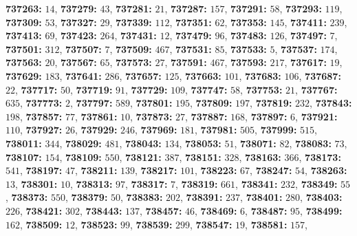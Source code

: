 \textsf{\bfseries 737263:} $14$, \textsf{\bfseries 737279:} $43$, \textsf{\bfseries 737281:} $21$, \textsf{\bfseries 737287:} $157$, \textsf{\bfseries 737291:} $58$, \textsf{\bfseries 737293:} $119$, \textsf{\bfseries 737309:} $53$, \textsf{\bfseries 737327:} $29$, \textsf{\bfseries 737339:} $112$, \textsf{\bfseries 737351:} $62$, \textsf{\bfseries 737353:} $145$, \textsf{\bfseries 737411:} $239$, \textsf{\bfseries 737413:} $69$, \textsf{\bfseries 737423:} $264$, \textsf{\bfseries 737431:} $12$, \textsf{\bfseries 737479:} $96$, \textsf{\bfseries 737483:} $126$, \textsf{\bfseries 737497:} $7$, \textsf{\bfseries 737501:} $312$, \textsf{\bfseries 737507:} $7$, \textsf{\bfseries 737509:} $467$, \textsf{\bfseries 737531:} $85$, \textsf{\bfseries 737533:} $5$, \textsf{\bfseries 737537:} $174$, \textsf{\bfseries 737563:} $20$, \textsf{\bfseries 737567:} $65$, \textsf{\bfseries 737573:} $27$, \textsf{\bfseries 737591:} $467$, \textsf{\bfseries 737593:} $217$, \textsf{\bfseries 737617:} $19$, \textsf{\bfseries 737629:} $183$, \textsf{\bfseries 737641:} $286$, \textsf{\bfseries 737657:} $125$, \textsf{\bfseries 737663:} $101$, \textsf{\bfseries 737683:} $106$, \textsf{\bfseries 737687:} $22$, \textsf{\bfseries 737717:} $50$, \textsf{\bfseries 737719:} $91$, \textsf{\bfseries 737729:} $109$, \textsf{\bfseries 737747:} $58$, \textsf{\bfseries 737753:} $21$, \textsf{\bfseries 737767:} $635$, \textsf{\bfseries 737773:} $2$, \textsf{\bfseries 737797:} $589$, \textsf{\bfseries 737801:} $195$, \textsf{\bfseries 737809:} $197$, \textsf{\bfseries 737819:} $232$, \textsf{\bfseries 737843:} $198$, \textsf{\bfseries 737857:} $77$, \textsf{\bfseries 737861:} $10$, \textsf{\bfseries 737873:} $27$, \textsf{\bfseries 737887:} $168$, \textsf{\bfseries 737897:} $6$, \textsf{\bfseries 737921:} $110$, \textsf{\bfseries 737927:} $26$, \textsf{\bfseries 737929:} $246$, \textsf{\bfseries 737969:} $181$, \textsf{\bfseries 737981:} $505$, \textsf{\bfseries 737999:} $515$, \textsf{\bfseries 738011:} $344$, \textsf{\bfseries 738029:} $481$, \textsf{\bfseries 738043:} $134$, \textsf{\bfseries 738053:} $51$, \textsf{\bfseries 738071:} $82$, \textsf{\bfseries 738083:} $73$, \textsf{\bfseries 738107:} $154$, \textsf{\bfseries 738109:} $550$, \textsf{\bfseries 738121:} $387$, \textsf{\bfseries 738151:} $328$, \textsf{\bfseries 738163:} $366$, \textsf{\bfseries 738173:} $541$, \textsf{\bfseries 738197:} $47$, \textsf{\bfseries 738211:} $139$, \textsf{\bfseries 738217:} $101$, \textsf{\bfseries 738223:} $67$, \textsf{\bfseries 738247:} $54$, \textsf{\bfseries 738263:} $13$, \textsf{\bfseries 738301:} $10$, \textsf{\bfseries 738313:} $97$, \textsf{\bfseries 738317:} $7$, \textsf{\bfseries 738319:} $661$, \textsf{\bfseries 738341:} $232$, \textsf{\bfseries 738349:} $55$, \textsf{\bfseries 738373:} $550$, \textsf{\bfseries 738379:} $50$, \textsf{\bfseries 738383:} $202$, \textsf{\bfseries 738391:} $237$, \textsf{\bfseries 738401:} $280$, \textsf{\bfseries 738403:} $226$, \textsf{\bfseries 738421:} $302$, \textsf{\bfseries 738443:} $137$, \textsf{\bfseries 738457:} $46$, \textsf{\bfseries 738469:} $6$, \textsf{\bfseries 738487:} $95$, \textsf{\bfseries 738499:} $162$, \textsf{\bfseries 738509:} $12$, \textsf{\bfseries 738523:} $99$, \textsf{\bfseries 738539:} $299$, \textsf{\bfseries 738547:} $19$, \textsf{\bfseries 738581:} $157$, 
